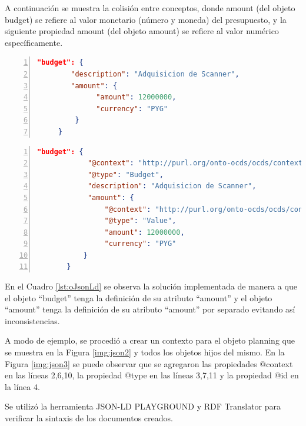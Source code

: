 A continuación se muestra la colisión entre conceptos, donde amount (del objeto budget) se refiere al valor monetario (número y moneda) del presupuesto, y la siguiente propiedad amount (del objeto amount) se refiere al valor numérico específicamente.\hfill \break

\noindent\begin{minipage}{\textwidth}
\begin{lstlisting}[captionpos=b, caption=Objeto JSON con colisión semántica entre conceptos, label=lst:oJson,language=json,firstnumber=1,  numbers=left,  numberstyle=\tiny\color{mygray},
    basicstyle=\footnotesize\ttfamily,frame=single]
    "budget": {
        "description": "Adquisicion de Scanner",
        "amount": {
              "amount": 12000000,
              "currency": "PYG"
         }
     }  
    \end{lstlisting}
\end{minipage}
\noindent
\begin{minipage}{\textwidth}
    \begin{lstlisting}[captionpos=b, caption=Objeto JSON-LD. Sin colisión semántica entre conceptos , label=lst:oJsonLd, language=json,firstnumber=1,  numbers=left,  numberstyle=\tiny\color{mygray},
    basicstyle=\footnotesize\ttfamily,frame=single]
        "budget": {
            "@context": "http://purl.org/onto-ocds/ocds/context-budget.json",
            "@type": "Budget",
            "description": "Adquisicion de Scanner",
            "amount": {
                "@context": "http://purl.org/onto-ocds/ocds/context-value.json",
                "@type": "Value",
                "amount": 12000000,
                "currency": "PYG"
           }
       }   
        \end{lstlisting}
    \end{minipage}

        En el Cuadro \ref{lst:oJsonLd} se observa la solución implementada de manera a que el objeto “budget” tenga la definición de su atributo “amount” y el objeto “amount” tenga la definición de su atributo “amount” por separado evitando así inconsistencias.

A modo de ejemplo, se procedió a crear un contexto para el objeto planning que se muestra en la Figura \ref{img:json2} y todos los objetos hijos del mismo. En la Figura \ref{img:json3} se puede observar que se agregaron las propiedades @context en las líneas 2,6,10, la propiedad @type en las líneas 3,7,11 y la propiedad @id en la línea 4.

Se utilizó la herramienta JSON-LD PLAYGROUND \cite{JSONLDPl78:online} y RDF Translator \cite{RDFTrans0:online} para verificar la sintaxis de los documentos creados.

